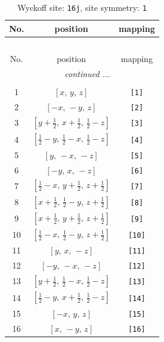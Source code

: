 \documentclass[fleqn,8pt]{jsarticle}
\begin{document}
\begin{longtable}{ccc}
\caption{Wyckoff site: {\tt 16j}, site symmetry: {\tt 1}}
 \\
 \hline \hline
No. & position & mapping \\ \hline \endfirsthead

\multicolumn{2}{l}{\tablename\ \thetable{}} \\
 \hline \hline
No. & position & mapping \\ \hline \endhead

 \hline \hline
\multicolumn{2}{r}{\footnotesize\it continued ...} \\ \endfoot

 \hline \hline
\multicolumn{2}{r}{} \\ \endlastfoot

1 & $\left[ x,\, y,\, z \right]$ & {\tt [1]} \\ \hline
2 & $\left[ - x,\, - y,\, z \right]$ & {\tt [2]} \\ \hline
3 & $\left[ y + \frac{1}{2},\, x + \frac{1}{2},\, \frac{1}{2} - z \right]$ & {\tt [3]} \\ \hline
4 & $\left[ \frac{1}{2} - y,\, \frac{1}{2} - x,\, \frac{1}{2} - z \right]$ & {\tt [4]} \\ \hline
5 & $\left[ y,\, - x,\, - z \right]$ & {\tt [5]} \\ \hline
6 & $\left[ - y,\, x,\, - z \right]$ & {\tt [6]} \\ \hline
7 & $\left[ \frac{1}{2} - x,\, y + \frac{1}{2},\, z + \frac{1}{2} \right]$ & {\tt [7]} \\ \hline
8 & $\left[ x + \frac{1}{2},\, \frac{1}{2} - y,\, z + \frac{1}{2} \right]$ & {\tt [8]} \\ \hline
9 & $\left[ x + \frac{1}{2},\, y + \frac{1}{2},\, z + \frac{1}{2} \right]$ & {\tt [9]} \\ \hline
10 & $\left[ \frac{1}{2} - x,\, \frac{1}{2} - y,\, z + \frac{1}{2} \right]$ & {\tt [10]} \\ \hline
11 & $\left[ y,\, x,\, - z \right]$ & {\tt [11]} \\ \hline
12 & $\left[ - y,\, - x,\, - z \right]$ & {\tt [12]} \\ \hline
13 & $\left[ y + \frac{1}{2},\, \frac{1}{2} - x,\, \frac{1}{2} - z \right]$ & {\tt [13]} \\ \hline
14 & $\left[ \frac{1}{2} - y,\, x + \frac{1}{2},\, \frac{1}{2} - z \right]$ & {\tt [14]} \\ \hline
15 & $\left[ - x,\, y,\, z \right]$ & {\tt [15]} \\ \hline
16 & $\left[ x,\, - y,\, z \right]$ & {\tt [16]} \\
\end{longtable}
\end{document}
